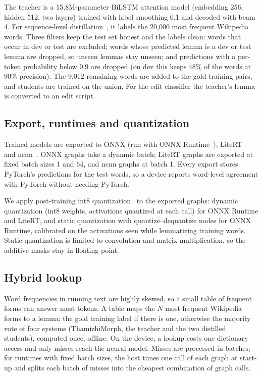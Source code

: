 \documentclass{sadhana}
\begin{document}
The teacher is a 15.8M-parameter BiLSTM attention model (embedding 256, hidden
512, two layers) trained with label smoothing 0.1 and decoded with beam 4. For
sequence-level distillation~\cite{kimrush}, it labels the 20,000 most frequent
Wikipedia words. Three filters keep the test set honest and the labels clean:
words that occur in dev or test are excluded; words whose predicted lemma is a
dev or test lemma are dropped, so unseen lemmas stay unseen; and predictions
with a per-token probability below 0.9 are dropped (on dev this keeps 48\% of
the words at 90\% precision). The 9,012 remaining words are added to the gold
training pairs, and students are trained on the union. For the edit classifier
the teacher's lemma is converted to an edit script.

\subsection{Export, runtimes and quantization}

Trained models are exported to ONNX (run with ONNX Runtime~\cite{onnxruntime}),
LiteRT~\cite{litert} and ncnn~\cite{ncnn}. ONNX graphs take a dynamic batch;
LiteRT graphs are exported at fixed batch sizes 1 and 64, and ncnn graphs at
batch 1. Every export stores PyTorch's predictions for the test words, so a
device reports word-level agreement with PyTorch without needing PyTorch.

We apply post-training int8 quantization~\cite{jacob} to the exported graphs:
dynamic quantization (int8 weights, activations quantized at each call) for
ONNX Runtime and LiteRT, and static quantization with quantize--dequantize
nodes for ONNX Runtime, calibrated on the activations seen while lemmatizing
training words. Static quantization is limited to convolution and matrix
multiplication, so the additive masks stay in floating point.

\subsection{Hybrid lookup}
\label{sec:hybrid}

Word frequencies in running text are highly skewed, so a small table of
frequent forms can answer most tokens. A table maps the $N$ most frequent
Wikipedia forms to a lemma: the gold training label if there is one, otherwise
the majority vote of four systems (ThamizhiMorph, the teacher and the two
distilled students), computed once, offline. On the device, a lookup costs one
dictionary access and only misses reach the neural model. Misses are processed
in batches; for runtimes with fixed batch sizes, the host times one call of each
graph at start-up and splits each batch of misses into the cheapest
combination of graph calls.
\end{document}
